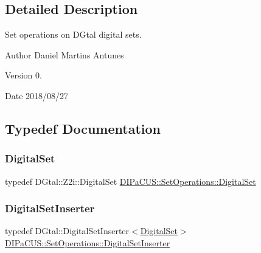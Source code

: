 \subsection{Detailed Description}
Set operations on D\+Gtal digital sets. 

\begin{DoxyAuthor}{Author}
Daniel Martins Antunes 
\end{DoxyAuthor}
\begin{DoxyVersion}{Version}
0. 
\end{DoxyVersion}
\begin{DoxyDate}{Date}
2018/08/27 
\end{DoxyDate}


\subsection{Typedef Documentation}
\mbox{\label{namespaceDIPaCUS_1_1SetOperations_a66926bf2c0a8f9e0192373c76f1b75e1}} 
\subsubsection{\texorpdfstring{Digital\+Set}{DigitalSet}}
{\footnotesize\ttfamily typedef D\+Gtal\+::\+Z2i\+::\+Digital\+Set \hyperlink{namespaceDIPaCUS_1_1SetOperations_a66926bf2c0a8f9e0192373c76f1b75e1}{D\+I\+Pa\+C\+U\+S\+::\+Set\+Operations\+::\+Digital\+Set}}

\mbox{\label{namespaceDIPaCUS_1_1SetOperations_a543100a4da6a06c13ee32ad5886d7031}} 
\subsubsection{\texorpdfstring{Digital\+Set\+Inserter}{DigitalSetInserter}}
{\footnotesize\ttfamily typedef D\+Gtal\+::\+Digital\+Set\+Inserter$<$\hyperlink{namespaceDIPaCUS_1_1SetOperations_a66926bf2c0a8f9e0192373c76f1b75e1}{Digital\+Set}$>$ \hyperlink{namespaceDIPaCUS_1_1SetOperations_a543100a4da6a06c13ee32ad5886d7031}{D\+I\+Pa\+C\+U\+S\+::\+Set\+Operations\+::\+Digital\+Set\+Inserter}}

